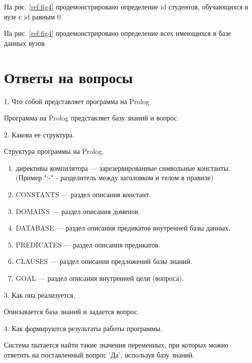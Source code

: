 \documentclass[a4paper,oneside,12pt]{extreport}
\begin{document}
\begin{task}
    На рис. \ref{ref:fig4} продемонстрировано определение id студентов,
    обучающихся в вузе с id равным 0.

    \begin{figure}[ht!]
    \end{figure}

    На рис. \ref{ref:fig4} продемонстрировано определение 
    всех имеющихся в базе данных вузов.     

    \begin{figure}[ht!]
    \end{figure}

\end{task}

\newpage

\section*{Ответы на вопросы}

1. Что собой представляет программа на Prolog

Программа на Prolog представляет базу знаний и вопрос.

2. Какова ее структура. 

Структура программы на Prolog.

\begin{enumerate}
    \item директивы компилятора — зарезервированные символьные константы. (Пример ":-" - разделитель между заголовком и телом в правиле) 
    \item CONSTANTS — раздел описания констант.
    \item DOMAINS — раздел описания доменов.
    \item DATABASE — раздел описания предикатов внутренней базы данных.
    \item PREDICATES — раздел описания предикатов.
    \item CLAUSES — раздел описания предложений базы знаний.
    \item GOAL — раздел описания внутренней цели (вопроса).
\end{enumerate}

3. Как она реализуется.

Описывается база знаний и задается вопрос.

4. Как формируются результаты работы программы. 

Система пытается найти такие значения переменных, при которых можно ответить на поставленный вопрос 'Да', используя базу знаний. %
\end{document}

